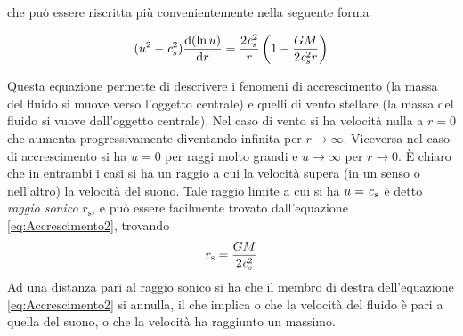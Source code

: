 che può essere riscritta più convenientemente nella seguente forma
\begin{EQ}
\begin{equation}
(u^2-\textit{c}_{s}^2) \dfrac{\mathrm{d} {(\ln u)}}{\mathrm{d} {r}} = \dfrac{2\textit{c}_{s}^2}{r} \left( 1-\dfrac{GM}{2\textit{c}_{s}^2 r} \right) \label{eq:Accrescimento2}
\end{equation}
\end{EQ}
Questa equazione permette di descrivere i fenomeni di accrescimento (la massa del fluido si muove verso l'oggetto centrale) e quelli di vento stellare (la massa del fluido si vuove dall'oggetto centrale). Nel caso di vento si ha velocità nulla a $r=0$ che aumenta progressivamente diventando infinita per $r\to\infty$. Viceversa nel caso di accrescimento si ha $u=0$ per raggi molto grandi e $u\to\infty$ per $r\to 0$. È chiaro che in entrambi i casi si ha un raggio a cui la velocità supera (in un senso o nell'altro) la velocità del suono. Tale raggio limite a cui si ha $u=\textit{c}_{s}$ è detto \textit{raggio sonico} $r_\mathrm{s}$, e può essere facilmente trovato dall'equazione \ref{eq:Accrescimento2}, trovando
\begin{equation}
r_\mathrm{s} = \dfrac{GM}{2\textit{c}_{s}^2}
\end{equation}
Ad una distanza pari al raggio sonico si ha che il membro di destra dell'equazione \ref{eq:Accrescimento2} si annulla, il che implica o che la velocità del fluido è pari a quella del suono, o che la velocità ha raggiunto un massimo.

